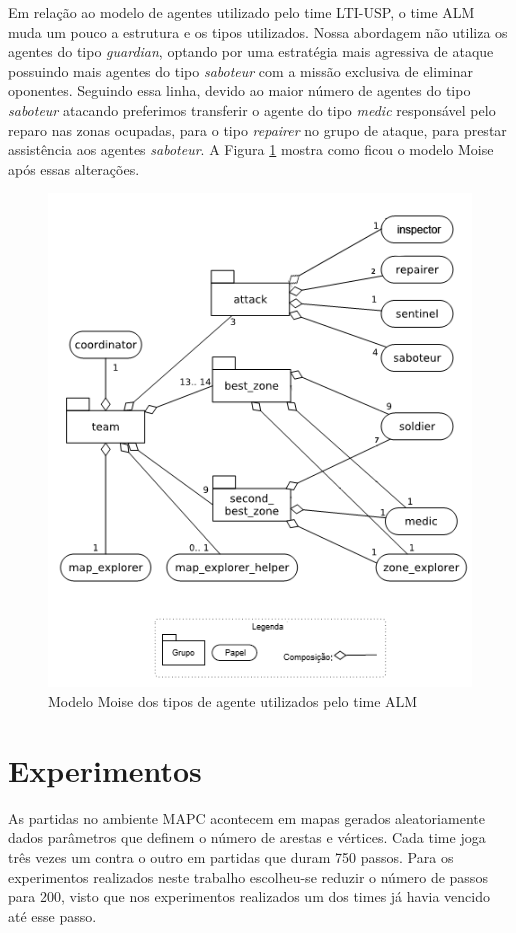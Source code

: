 \documentclass{llncs}
\begin{document}
Em relação ao modelo de agentes utilizado pelo time LTI-USP, o time ALM muda um pouco a estrutura e os tipos utilizados. Nossa abordagem não utiliza os agentes do tipo \textit{guardian}, optando por uma estratégia mais agressiva de ataque possuindo mais agentes do tipo \textit{saboteur} com a missão exclusiva de eliminar oponentes. Seguindo essa linha, devido ao maior número de agentes do tipo \textit{saboteur} atacando preferimos transferir o agente do tipo \textit{medic} responsável pelo reparo nas zonas ocupadas, para o tipo \textit{repairer} no grupo de ataque, para prestar assistência aos agentes \textit{saboteur}. A Figura \ref{fig:fig2} mostra como ficou o modelo Moise após essas alterações.

\begin{figure}[!ht]
\centering
\includegraphics[width=0.7\linewidth]{./images/fig2.png}
\caption{Modelo Moise dos tipos de agente utilizados pelo time ALM}
\label{fig:fig2}
\end{figure}

\section{Experimentos}

As partidas no ambiente MAPC acontecem em mapas gerados aleatoriamente dados parâmetros que definem o número de arestas e vértices. Cada time joga três vezes um contra o outro em partidas que duram 750 passos. Para os experimentos realizados neste trabalho escolheu-se reduzir o número de passos para 200, visto que nos experimentos realizados um dos times já havia vencido até esse passo.
\end{document}
